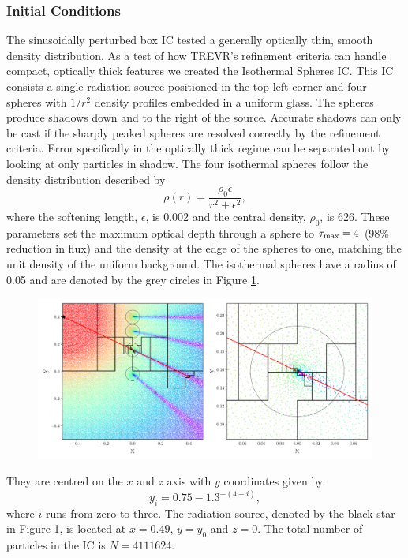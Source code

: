 \documentclass[fleq,usenatbib]{mnras}
\newcommand{\acro}{TREVR}
\begin{document}
\subsubsection{Initial Conditions}
The sinusoidally perturbed box IC tested a generally optically thin, smooth 
density distribution. As a test of how \acro{}'s refinement criteria can 
handle compact, optically thick features we created the Isothermal Spheres IC. 
This IC consists a single radiation source positioned in the top left corner 
and four spheres with $1/r^2$ density profiles embedded in a uniform glass. 
The spheres produce shadows down and to the right of the source. Accurate 
shadows can only be cast if the sharply peaked spheres are resolved correctly 
by the refinement criteria. Error specifically in the optically thick regime 
can be separated out by looking at only particles in shadow. The four 
isothermal spheres follow the density distribution described by
\begin{equation}
\rho(r) = \frac{\rho_0 \epsilon}{r^2 + \epsilon^2},
\end{equation}
where the softening length, $\epsilon$, is 0.002 and the central density, 
$\rho_0$, is 626.  These parameters set the maximum optical depth through a 
sphere to $\tau_{\rm max}=4$ (98\% reduction in flux) and the density at the 
edge of the spheres to one, matching the unit density of the uniform 
background. The isothermal spheres have a radius of 0.05 and are denoted by 
the grey circles in Figure \ref{fig:cellplot}.  
\begin{figure}
\includegraphics[width=1\linewidth]{Figures/cellplot.pdf}
\caption{}
\label{fig:cellplot}
\end{figure}
They are centred on the $x$ and $z$ axis with $y$ coordinates given by
\begin{equation}
y_i = 0.75 - 1.3^{-(4-i)},
\end{equation}
where $i$ runs from zero to three. The radiation source, denoted by the black 
star in Figure \ref{fig:cellplot}, is located at $x=0.49$, $y=y_0$ and $z=0$. 
The total number of particles in the IC is $N=4111624$.
\end{document}
